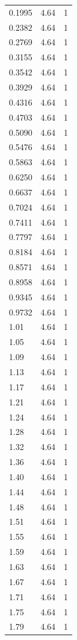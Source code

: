 \begin{longtable}{lrr}
  0.1995 & 4.64 & 1 \\
  0.2382 & 4.64 & 1 \\
  0.2769 & 4.64 & 1 \\
  0.3155 & 4.64 & 1 \\
  0.3542 & 4.64 & 1 \\
  0.3929 & 4.64 & 1 \\
  0.4316 & 4.64 & 1 \\
  0.4703 & 4.64 & 1 \\
  0.5090 & 4.64 & 1 \\
  0.5476 & 4.64 & 1 \\
  0.5863 & 4.64 & 1 \\
  0.6250 & 4.64 & 1 \\
  0.6637 & 4.64 & 1 \\
  0.7024 & 4.64 & 1 \\
  0.7411 & 4.64 & 1 \\
  0.7797 & 4.64 & 1 \\
  0.8184 & 4.64 & 1 \\
  0.8571 & 4.64 & 1 \\
  0.8958 & 4.64 & 1 \\
  0.9345 & 4.64 & 1 \\
  0.9732 & 4.64 & 1 \\
  1.01 & 4.64 & 1 \\
  1.05 & 4.64 & 1 \\
  1.09 & 4.64 & 1 \\
  1.13 & 4.64 & 1 \\
  1.17 & 4.64 & 1 \\
  1.21 & 4.64 & 1 \\
  1.24 & 4.64 & 1 \\
  1.28 & 4.64 & 1 \\
  1.32 & 4.64 & 1 \\
  1.36 & 4.64 & 1 \\
  1.40 & 4.64 & 1 \\
  1.44 & 4.64 & 1 \\
  1.48 & 4.64 & 1 \\
  1.51 & 4.64 & 1 \\
  1.55 & 4.64 & 1 \\
  1.59 & 4.64 & 1 \\
  1.63 & 4.64 & 1 \\
  1.67 & 4.64 & 1 \\
  1.71 & 4.64 & 1 \\
  1.75 & 4.64 & 1 \\
  1.79 & 4.64 & 1 \\

\end{longtable}
